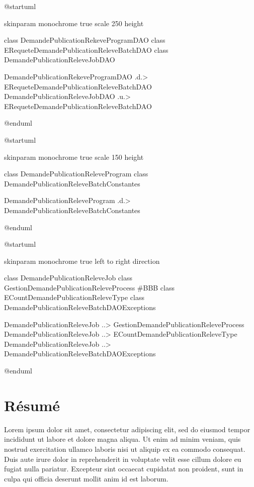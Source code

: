 \documentclass[a4paper, 12pt]{report}
\begin{document}
\begin{center}
  \begin{plantuml}
    @startuml

    skinparam monochrome true
    scale 250 height

    class DemandePublicationRekeveProgramDAO
    class ERequeteDemandePublicationReleveBatchDAO
    class DemandePublicationReleveJobDAO

    DemandePublicationRekeveProgramDAO .d.> ERequeteDemandePublicationReleveBatchDAO
    DemandePublicationReleveJobDAO .u.> ERequeteDemandePublicationReleveBatchDAO

    @enduml
  \end{plantuml}
\end{center}
\begin{center}
  \begin{plantuml}
    @startuml

    skinparam monochrome true
    scale 150 height

    class DemandePublicationReleveProgram
    class DemandePublicationReleveBatchConstantes

    DemandePublicationReleveProgram .d.> DemandePublicationReleveBatchConstantes

    @enduml
  \end{plantuml}
\end{center}
\begin{center}
  \begin{plantuml}
    @startuml

    skinparam monochrome true
    left to right direction

    class DemandePublicationReleveJob
    class GestionDemandePublicationReleveProcess #BBB
    class ECountDemandePublicationReleveType
    class DemandePublicationReleveBatchDAOExceptions

    DemandePublicationReleveJob ..> GestionDemandePublicationReleveProcess
    DemandePublicationReleveJob ..> ECountDemandePublicationReleveType
    DemandePublicationReleveJob ..> DemandePublicationReleveBatchDAOExceptions

    @enduml
  \end{plantuml}
\end{center}

\tableofcontents
\thispagestyle{empty}

\chapter*{Résumé}
\thispagestyle{empty}

Lorem ipsum dolor sit amet, consectetur adipiscing elit, sed do eiusmod tempor incididunt ut labore et dolore magna aliqua. Ut enim ad minim veniam, quis nostrud exercitation ullamco laboris nisi ut aliquip ex ea commodo consequat. Duis aute irure dolor in reprehenderit in voluptate velit esse cillum dolore eu fugiat nulla pariatur. Excepteur sint occaecat cupidatat non proident, sunt in culpa qui officia deserunt mollit anim id est laborum. 
\end{document}
